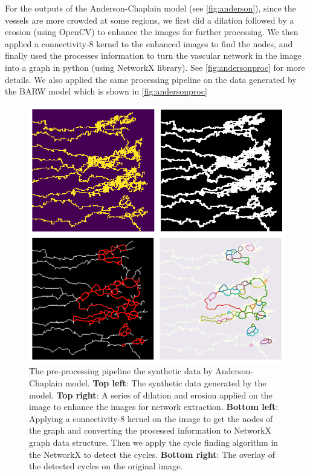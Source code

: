 \documentclass[10pt,a4paper,twocolumn]{article}
\begin{document}
	For the outputs of the Anderson-Chaplain model (see \autoref{fig:anderson}), since the vessels are more crowded at some regions, we first did a dilation followed by a erosion (using OpenCV) to enhance the images for further processing. We then applied a connectivity-8 kernel to the enhanced images to find the nodes, and finally used the processes information to turn the vascular network in the image into a graph in python (using NetworkX library). See \autoref{fig:andersonproc} for more details. We also applied the same processing pipeline on the data generated by the BARW model which is shown in \autoref{fig:andersonproc}
	
	\begin{figure}[h!]
		\centering
		\includegraphics[width=1\linewidth]{images/AndersonProc}
		\caption{The pre-processing pipeline the synthetic data by Anderson-Chaplain model.\textbf{ Top left}: The synthetic data generated by the model. \textbf{Top right}: A series of dilation and erosion applied on the image to enhance the images for network extraction. \textbf{Bottom left}: Applying a connectivity-8 kernel on the image to get the nodes of the graph and converting the processed information to NetworkX graph data structure. Then we apply the cycle finding algorithm in the NetworkX to detect the cycles. \textbf{Bottom right}: The overlay of the detected cycles on the original image.}
		\label{fig:andersonproc}
	\end{figure}
	
\end{document}
